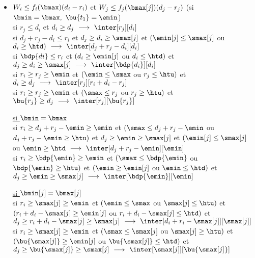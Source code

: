 \documentclass{report}
\begin{document}
\begin{itemize}
\item $W_i\le f_i(\bmax)(d_i-r_i)$ et $W_j\le f_j(\bmax[j])(d_j-r_j)$ 
(si $\bmin=\bmax,\ \bu{t_1}=\emin$)\\
\vspace{0.2cm}
si $r_j \le d_i$ et $ d_i \ge d_j\ \longrightarrow\ \inter[r_j][d_i]$\\
\vspace{0.1cm}
si $d_j+r_j-d_i \le r_i$ et $d_j \ge d_i \ge \smax[j]$ et 
$(\emin[j] \le \smax[j]$ ou $d_i \ge \htd)\ \longrightarrow\ 
\inter[d_j+r_j-d_i][d_i]$\\
\vspace{0.1cm}
si $\bdp{di} \le r_i$ et $(d_i \ge \emin[j]$ ou $d_i \le \htd)$ et 
$d_j \ge d_i \ge \smax[j]\ \longrightarrow\ \inter[\bdp{d_i}][d_i]$\\
\vspace{0.1cm}
si $r_i \ge r_j \ge \emin$ et $(\emin \le \smax$ ou $r_j\le \htu)$ et 
$d_i \ge d_j\ \longrightarrow\ \inter[r_j][r_i+d_i-r_j]$\\
\vspace{0.1cm}
si $r_i \ge r_j \ge \emin$ et $(\smax \le r_j$ ou $ r_j \ge \htu)$ et 
$\bu{r_j} \ge d_j\ \longrightarrow\ \inter[r_j][\bu{r_j}]$\\
\vspace{0.25cm}

\underline{si $\bmin=\bmax$}\\
\vspace{0.2cm}
si $r_i \ge d_j+r_j-\emin \ge \emin$ et 
$(\smax \le d_j+r_j-\emin$ ou $d_j+r_j-\emin \ge \htu)$ et 
$d_j \ge \emin \ge \smax[j]$ et \linebreak $(\emin[j] \le \smax[j]$ ou 
$\emin \ge \htd\ \longrightarrow\ \inter[d_j+r_j-\emin][\emin]$\\
\vspace{0.1cm}
si $r_i \ge \bdp{\emin} \ge \emin$ et  
$(\smax \le \bdp{\emin}$ ou $\bdp{\emin} \ge \htu)$ et 
$(\emin \ge \emin[j]$ ou $\emin \le \htd)$ et \linebreak 
$d_j \ge \emin \ge \smax[j]\ 
\longrightarrow\   \inter[\bdp{\emin}][\emin]$\\
\vspace{0.25cm}

\underline{si $\bmin[j]=\bmax[j]$}\\
\vspace{0.2cm}
si $r_i \ge \smax[j] \ge \emin$ et $(\emin \le \smax$ ou $\smax[j] \le \htu)$ 
et $(r_i+d_i-\smax[j] \ge \emin[j]$ ou $r_i+d_i-\smax[j] \le \htd)$ et 
$d_j \ge r_i+d_i-\smax[j] \ge \smax[j]\ \longrightarrow\ 
\inter[{d_i+r_i-\smax[j]}][{\smax[j]}]$\\
\vspace{0.1cm}
si $r_i \ge \smax[j] \ge \emin$ et 
$(\smax \le \smax[j]$ ou $\smax[j] \ge \htu)$ et  
$(\bu{\smax[j]} \ge \emin[j]$ ou $\bu{\smax[j]} \le \htd)$ et \linebreak
$d_j \ge \bu{\smax[j]} \ge \smax[j]\ \longrightarrow\ 
\inter[{\smax[j]} ][\bu{\smax[j]}]$\\


\end{itemize}
\end{document}

